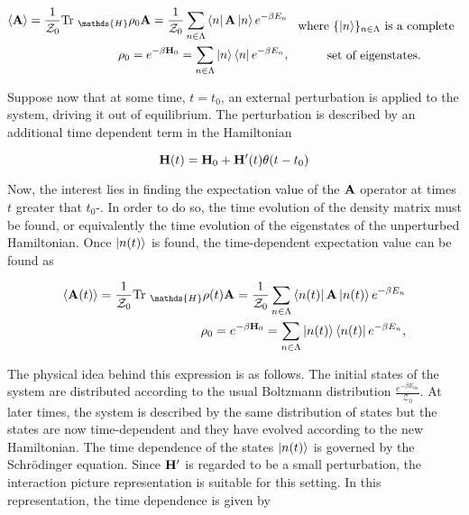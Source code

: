 \documentclass{homework}
\begin{document}
\begin{equation}
    \begin{split}
        \langle {\bf A} \rangle = \frac{1}{\mathcal{Z}_0} \textnormal{Tr }_{\mathds{H}} \rho_0 {\bf A}  = \frac{1}{\mathcal{Z}_0} \sum_{n \in \Lambda} \bra{n} {{\bf A}} \ket{n} e^{-\beta E_n} \\
        \rho_0 = e^{-\beta {\bf H}_0} = \sum_{n \in \Lambda} \ket{n} \bra{n} e^{-\beta E_n},
    \end{split} \begin{array}{c}
         \textnormal{ where $\{\ket{n}\}_{n \in \Lambda}$ is a complete} \\
         \\
         \textnormal{set of eigenstates}.
    \end{array}
\end{equation}

Suppose now that at some time, $t = t_0$, an external perturbation is applied to the system, driving it out of equilibrium. The perturbation is described by an additional time dependent term in the Hamiltonian 

\begin{equation}
    {\bf H}(t) = {\bf H}_0 + {\bf H}'(t) \theta(t-t_0)
\end{equation}

Now, the interest lies in finding the expectation value of the ${\bf A}$ operator at times $t$ greater that $t_0$-. In order to do so, the time evolution of the density matrix must be found, or equivalently the time evolution of the eigenstates of the unperturbed Hamiltonian. Once $\ket{n(t)}$ is found, the time-dependent expectation value can be found as 

\begin{align}
        \langle {\bf A}(t) \rangle = \frac{1}{\mathcal{Z}_0} \textnormal{Tr }_{\mathds{H}} \rho(t) {\bf A}  = \frac{1}{\mathcal{Z}_0} \sum_{n \in \Lambda} \bra{n(t)} {{\bf A}} \ket{n(t)} e^{-\beta E_n} \\
        \rho_0 = e^{-\beta {\bf H}_0} = \sum_{n \in \Lambda} \ket{n(t)} \bra{n(t)} e^{-\beta E_n},
\end{align}

The physical idea behind this expression is as follows. The initial states of the system are distributed according to the usual Boltzmann distribution $\frac{e^{-\beta E_{0n}}}{\mathcal{Z_0}}$. At later times, the system is described by the same distribution of states but the states are now time-dependent and they have evolved according to the new Hamiltonian. The time dependence of the states $\ket{n(t)}$ is governed by the Schr\"odinger equation. Since ${\bf H}'$ is regarded to be a small perturbation, the interaction picture representation is suitable for this setting. In this representation, the time dependence is given by 
\end{document}
